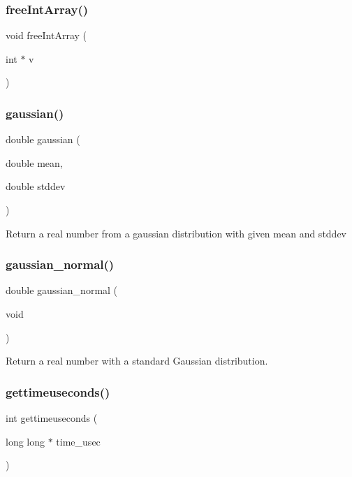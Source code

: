 \subsubsection{free\+Int\+Array()}
{\footnotesize\ttfamily void free\+Int\+Array (\begin{DoxyParamCaption}\item[{int $\ast$}]{v }\end{DoxyParamCaption})}

\label{lib__util_8c_a8d0940427034cc3fd70a33400ba9ac16} 
\subsubsection{gaussian()}
{\footnotesize\ttfamily double gaussian (\begin{DoxyParamCaption}\item[{double}]{mean,  }\item[{double}]{stddev }\end{DoxyParamCaption})}

Return a real number from a gaussian distribution with given mean and stddev \label{lib__util_8c_a8d93a4b3f317a076a2530b64f8f5094c} 
\subsubsection{gaussian\+\_\+normal()}
{\footnotesize\ttfamily double gaussian\+\_\+normal (\begin{DoxyParamCaption}\item[{void}]{ }\end{DoxyParamCaption})}

Return a real number with a standard Gaussian distribution. \label{lib__util_8c_a82c8fe5237ffab8806520a9c3e6d5629} 
\subsubsection{gettimeuseconds()}
{\footnotesize\ttfamily int gettimeuseconds (\begin{DoxyParamCaption}\item[{long long $\ast$}]{time\+\_\+usec }\end{DoxyParamCaption})}

